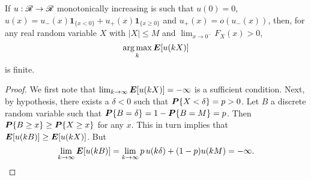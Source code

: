 \begin{claim}
  If $u:\mathscr{R}\to\mathscr{R}$ monotonically increasing is such that $u(0) = 0$,
  $u(x) = u_-(x)\bm1_{\{x<0\}}+u_+(x)\bm 1_{\{x\geq 0\}}$ and $u_+(x) = o(u_-(x))$, then,
  for any real random variable $X$ with $|X|\leq M$ and $\lim_{x\to0^-}F_X(x)>0$,
  \begin{equation*}
    \operatorname*{arg\,max}_k \bm E[u(kX)]
  \end{equation*}
  is finite.
\end{claim}
\begin{proof}
  We first note that $\lim_{k\to\infty} \bm E[u(kX)]=-\infty$ is a sufficient condition. Next,
  by hypothesis, there exists a $\delta<0$ such that $\bm P\{X<\delta\}=p>0$. Let $B$ a
  discrete random variable such that $\bm P\{B=\delta\}=1-\bm P\{B=M\}=p$. Then $\bm P\{B\geq
  x\}\geq\bm P\{X\geq x\}$ for any $x$. This in turn implies that
  $\bm E[u(kB)]\geq\bm E[u(kX)]$. But 
  \begin{equation*}
    \lim_{k\to\infty}\bm E[u(kB)] = \lim_{k\to\infty}p\,u(k\delta)+(1-p)u(kM) = -\infty.\qedhere
  \end{equation*}
\end{proof}

